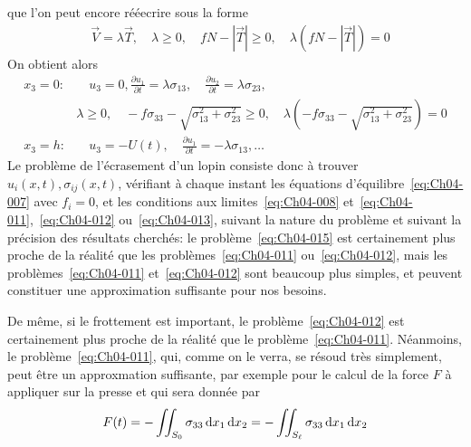 \noindent que l'on peut encore rééecrire sous la forme
\begin{equation}
    \begin{aligned}
        &\vec{V} = \lambda \vec{T},\quad\lambda \geq 0, \quad fN - |\vec{T}| \geq 0, \quad \lambda \left( fN - |\vec{T}| \right) = 0
    \end{aligned}
    \label{eq:Ch04-014}
\end{equation}
On obtient alors
\begin{equation}
    \begin{aligned}
        x_3 = 0:&\quad u_3 = 0, \frac{\partial u_1}{\partial t} =\lambda \sigma_{13},\quad \frac{\partial u_2}{\partial t} = \lambda \sigma_{23}, \\
            & \lambda \geq 0,\quad -f \sigma_{33} - \sqrt{\sigma_{13}^2 + \sigma_{23}^2} \geq 0,\quad \lambda \left( -f \sigma_{33} - \sqrt{\sigma_{13}^2 + \sigma_{23}^2} \right) = 0 \\
        x_3 = h:&\quad u_3 = -U(t),\quad \frac{\partial u_1}{\partial t} = -\lambda \sigma_{13},\ldots
    \end{aligned}
    \label{eq:Ch04-015}
\end{equation}
Le problème de l'écrasement d'un lopin consiste donc à trouver $u_i(x,t), \sigma_{ij}(x,t)$, vérifiant à chaque instant les équations d'équilibre~\eqref{eq:Ch04-007} avec $f_i = 0$, et les conditions aux limites~\eqref{eq:Ch04-008} et~\eqref{eq:Ch04-011},~\eqref{eq:Ch04-012} ou~\eqref{eq:Ch04-013}, suivant la nature du problème et suivant la précision des résultats cherchés: le problème~\eqref{eq:Ch04-015} est certainement plus proche de la réalité que les problèmes~\eqref{eq:Ch04-011} ou~\eqref{eq:Ch04-012}, mais les problèmes~\eqref{eq:Ch04-011} et~\eqref{eq:Ch04-012} sont beaucoup plus simples, et peuvent constituer une approximation suffisante pour nos besoins.

De même, si le frottement est important, le problème~\eqref{eq:Ch04-012} est certainement plus proche de la réalité que le problème~\eqref{eq:Ch04-011}.
Néanmoins, le problème~\eqref{eq:Ch04-011}, qui, comme on le verra, se résoud très simplement, peut être un approxmation suffisante, par exemple pour le calcul de la force $F$ à appliquer sur la presse et qui sera donnée par
\begin{equation}
    F(t) = - \iint_{S_0} \sigma_{33} \mathop{\mathrm{{}d}}\mathopen{} x_1 \mathop{\mathrm{{}d}}\mathopen{} x_2 = - \iint_{S_\ell} \sigma_{33} \mathop{\mathrm{{}d}}\mathopen{} x_1 \mathop{\mathrm{{}d}}\mathopen{} x_2
    \label{eq:Ch04-016}
\end{equation}

